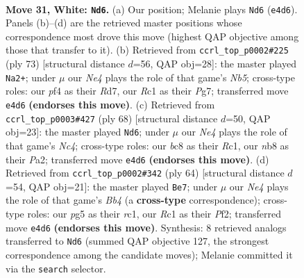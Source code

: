 \documentclass[11pt]{article}
\begin{document}
\clearpage

\begin{figure}[p]\centering
\begin{subfigure}{0.46\textwidth}\centering
\resizebox{\linewidth}{!}{%
\newchessgame
\chessboard[
  setfen={1nb4r/6k1/1p2p3/4r1p1/4Np2/3B1P2/2P5/2RN1K2 w - - 0 31},
  showmover=false,
  pgfstyle=straightmove, color=movearrow, markmove={e4-d6}
]}
\caption{}
\end{subfigure}\hfill
\begin{subfigure}{0.46\textwidth}\centering
\resizebox{\linewidth}{!}{%
\newchessgame
\chessboard[
  setfen={8/2br2pp/1k6/p7/1n2R1PP/4RP2/1PP5/2K5 b - - 6 37},
  showmover=false,
  pgfstyle=straightmove, color=movearrow, markmove={b4-a2}
]}
\caption{}
\end{subfigure}
\\[4pt]
\begin{subfigure}{0.46\textwidth}\centering
\resizebox{\linewidth}{!}{%
\newchessgame
\chessboard[
  setfen={1r1b4/5pk1/4p3/1bB1P1np/2N5/1B4P1/P4K2/2R5 w - - 0 35},
  showmover=false,
  pgfstyle=straightmove, color=movearrow, markmove={c4-d6}
]}
\caption{}
\end{subfigure}\hfill
\begin{subfigure}{0.46\textwidth}\centering
\resizebox{\linewidth}{!}{%
\newchessgame
\chessboard[
  setfen={6k1/5p1p/p5p1/R2P4/1Br4P/6N1/5P1K/2r5 w - - 0 33},
  showmover=false,
  pgfstyle=straightmove, color=movearrow, markmove={b4-e7}
]}
\caption{}
\end{subfigure}
\caption{\textbf{Move 31, White: \texttt{Nd6}.} (a) Our position; Melanie plays \texttt{Nd6} (\texttt{e4d6}). Panels (b)--(d) are the retrieved master positions whose correspondence most drove this move (highest QAP objective among those that transfer to it). (b) Retrieved from \texttt{ccrl\_top\_p0002\#225} (ply 73) [structural distance $d$=56, QAP obj=28]: the master played \texttt{Na2+}; under $\mu$ our \emph{Ne4} plays the role of that game's \emph{Nb5}; cross-type roles: our \emph{p}f4 as their \emph{R}d7, our \emph{R}c1 as their \emph{P}g7; transferred move \texttt{e4d6} \textbf{(endorses this move)}. (c) Retrieved from \texttt{ccrl\_top\_p0003\#427} (ply 68) [structural distance $d$=50, QAP obj=23]: the master played \texttt{Nd6}; under $\mu$ our \emph{Ne4} plays the role of that game's \emph{Nc4}; cross-type roles: our \emph{b}c8 as their \emph{R}c1, our \emph{n}b8 as their \emph{P}a2; transferred move \texttt{e4d6} \textbf{(endorses this move)}. (d) Retrieved from \texttt{ccrl\_top\_p0002\#342} (ply 64) [structural distance $d$=54, QAP obj=21]: the master played \texttt{Be7}; under $\mu$ our \emph{Ne4} plays the role of that game's \emph{Bb4} (a \textbf{cross-type} correspondence); cross-type roles: our \emph{p}g5 as their \emph{r}c1, our \emph{R}c1 as their \emph{P}f2; transferred move \texttt{e4d6} \textbf{(endorses this move)}. Synthesis: 8 retrieved analogs transferred to \texttt{Nd6} (summed QAP objective 127, the strongest correspondence among the candidate moves); Melanie committed it via the \texttt{search} selector.}
\label{fig:thought-m60}
\end{figure}
\end{document}
